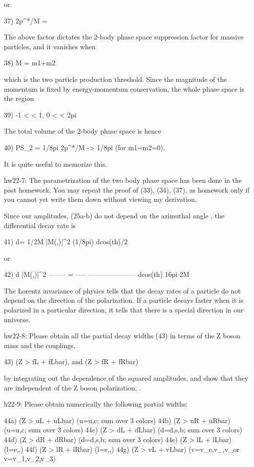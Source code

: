 \documentclass[12pt]{article}
\begin{document}
{{or

37) 2p^*/M
  = \sqrt{[1+(m1+m2)/M][1-(m1+m2)/M][1+(m1-m2)/M][1-(m1-m2)/M]}

The above factor dictates the 2-body phase space suppression factor
for massive particles, and it vanishes when

38) M = m1+m2

which is the two particle production threshold.  Since the magnitude of
the momentum is fixed by energy-momentum conservation, the whole phase
space is the region

39) -1 < \cos\theta < 1, 0 < \phi < 2pi

The total volume of the 2-body phase space is hence

40) PS_2 = 1/8pi 2p^*/M -> 1/8pi (for m1=m2=0).

It is quite useful to memorize this.

hw22-7:  The parametrization of the two body phase space has been done
in the past homework.  You may repeat the proof of (33), (34), (37),
as homework only if you cannot yet write them down without viewing
my derivation.

Since our amplitudes, (25a-b) do not depend on the azimuthal angle \phi,
the differential decay rate is

41) d\Gamma = 1/2M |M(\lambda,\theta)|^2 (1/8pi) dcos(th)/2

or

42) d    |M(\lambda,\theta)|^2
    -------- = -----  ---------------------
    dcos(th)    16pi          2M

The Lorentz invariance of physics tells that the decay rates of
a particle do not depend on the direction of the polarization.
If a particle decays faster when it is polarized in a particular
direction, it tells that there is a special direction in our universe.

hw22-8: Please obtain all the partial decay widths (43) in terms of
the Z boson mass and the couplings.

43) \Gamma(Z > fL + fLbar), and \Gamma(Z > fR + fRbar)

by integrating out the \cos\theta dependence of the squared amplitudes,
and show that they are independent of the Z boson polarization,
\lambda.

h22-9: Please obtain numerically the following partial widths:

44a) \Gamma(Z > uL + uLbar)  (u=u,c;   sum over 3 colors)
44b) \Gamma(Z > uR + uRbar)  (u=u,c;   sum over 3 colors)
44c) \Gamma(Z > dL + dLbar)  (d=d,s,b; sum over 3 colors)
44d) \Gamma(Z > dR + dRbar)  (d=d,s,b; sum over 3 colors)
44e) \Gamma(Z > lL + lLbar)  (l=e,\mu,\tau)
44f) \Gamma(Z > lR + lRbar)  (l=e,\mu,\tau)
44g) \Gamma(Z > vL + vLbar)  (v=v_e,v_\mu,v_\tau or v=v_1,v_2,v_3)

}}
\end{document}
